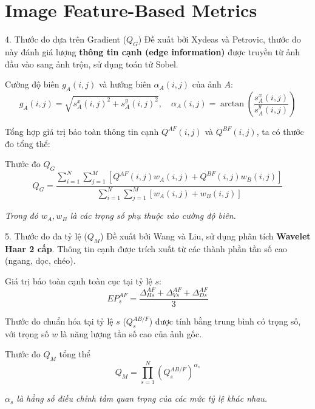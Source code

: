 \documentclass{beamer}
\begin{document}
\section{Image Feature-Based Metrics}

\begin{frame}{4. Thước đo dựa trên Gradient ($Q_G$)}
    Đề xuất bởi Xydeas và Petrovic, thước đo này đánh giá lượng \textbf{thông tin cạnh (edge information)} được truyền từ ảnh đầu vào sang ảnh trộn, sử dụng toán tử Sobel.

    \vspace{0.2cm}
    Cường độ biên $g_A(i,j)$ và hướng biên $\alpha_A(i,j)$ của ảnh $A$:
    \begin{equation}
        g_A(i,j) = \sqrt{s^x_A(i,j)^2 + s^y_A(i,j)^2}, \quad \alpha_A(i,j) = \arctan \left( \frac{s^x_A(i,j)}{s^y_A(i,j)} \right)
    \end{equation}

    \vspace{0.2cm}
    Tổng hợp giá trị bảo toàn thông tin cạnh $Q^{AF}(i,j)$ và $Q^{BF}(i,j)$, ta có thước đo tổng thể:
    \begin{block}{Thước đo $Q_G$}
    \begin{equation}
        Q_G = \frac{\sum_{i=1}^N \sum_{j=1}^M \left[ Q^{AF}(i,j)w_A(i,j) + Q^{BF}(i,j)w_B(i,j) \right]}{\sum_{i=1}^N \sum_{j=1}^M \left[ w_A(i,j) + w_B(i,j) \right]}
    \end{equation}
    \end{block}
    \footnotesize{\textit{Trong đó $w_A, w_B$ là các trọng số phụ thuộc vào cường độ biên.}}
\end{frame}

\begin{frame}{5. Thước đo đa tỷ lệ ($Q_M$)}
    Đề xuất bởi Wang và Liu, sử dụng phân tích \textbf{Wavelet Haar 2 cấp}. Thông tin cạnh được trích xuất từ các thành phần tần số cao (ngang, dọc, chéo).

    \vspace{0.2cm}
    Giá trị bảo toàn cạnh toàn cục tại tỷ lệ $s$:
    \begin{equation}
        EP^{AF}_s = \frac{\Delta^{AF}_{Hs} + \Delta^{AF}_{Vs} + \Delta^{AF}_{Ds}}{3}
    \end{equation}

    Thước đo chuẩn hóa tại tỷ lệ $s$ ($Q_s^{AB/F}$) được tính bằng trung bình có trọng số, với trọng số $w$ là năng lượng tần số cao của ảnh gốc.

    \begin{block}{Thước đo $Q_M$ tổng thể}
    \begin{equation}
        Q_M = \prod_{s=1}^N \left( Q_s^{AB/F} \right)^{\alpha_s}
    \end{equation}
    \end{block}
    \footnotesize{\textit{$\alpha_s$ là hằng số điều chỉnh tầm quan trọng của các mức tỷ lệ khác nhau.}}
\end{frame}
\end{document}
